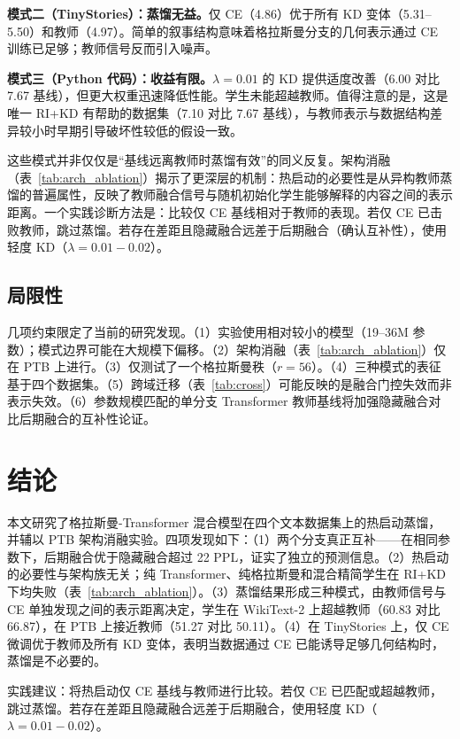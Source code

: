 \documentclass[conference]{IEEEtran}
\begin{document}
\textbf{模式二（TinyStories）：蒸馏无益。}仅 CE（4.86）优于所有 KD 变体（5.31--5.50）和教师（4.97）。简单的叙事结构意味着格拉斯曼分支的几何表示通过 CE 训练已足够；教师信号反而引入噪声。

\textbf{模式三（Python 代码）：收益有限。}$\lambda{=}0.01$ 的 KD 提供适度改善（6.00 对比 7.67 基线），但更大权重迅速降低性能。学生未能超越教师。值得注意的是，这是唯一 RI+KD 有帮助的数据集（7.10 对比 7.67 基线），与教师表示与数据结构差异较小时早期引导破坏性较低的假设一致。

这些模式并非仅仅是“基线远离教师时蒸馏有效”的同义反复。架构消融（表~\ref{tab:arch_ablation}）揭示了更深层的机制：热启动的必要性是从异构教师蒸馏的普遍属性，反映了教师融合信号与随机初始化学生能够解释的内容之间的表示距离。一个实践诊断方法是：比较仅 CE 基线相对于教师的表现。若仅 CE 已击败教师，跳过蒸馏。若存在差距且隐藏融合远差于后期融合（确认互补性），使用轻度 KD（$\lambda{=}0.01{-}0.02$）。

\subsection{局限性}
几项约束限定了当前的研究发现。（1）实验使用相对较小的模型（19--36M 参数）；模式边界可能在大规模下偏移\cite{hu2022lora,dettmers2023qlora,zhang2023adalora}。（2）架构消融（表~\ref{tab:arch_ablation}）仅在 PTB 上进行。（3）仅测试了一个格拉斯曼秩（$r{=}56$）。（4）三种模式的表征基于四个数据集。（5）跨域迁移（表~\ref{tab:cross}）可能反映的是融合门控失效而非表示失效。（6）参数规模匹配的单分支 Transformer 教师基线将加强隐藏融合对比后期融合的互补性论证。

\section{结论}

本文研究了格拉斯曼-Transformer 混合模型在四个文本数据集上的热启动蒸馏，并辅以 PTB 架构消融实验。四项发现如下：（1）两个分支真正互补——在相同参数下，后期融合优于隐藏融合超过 22 PPL，证实了独立的预测信息。（2）热启动的必要性与架构族无关；纯 Transformer、纯格拉斯曼和混合精简学生在 RI+KD 下均失败（表~\ref{tab:arch_ablation}）。（3）蒸馏结果形成三种模式，由教师信号与 CE 单独发现之间的表示距离决定，学生在 WikiText-2 上超越教师（60.83 对比 66.87），在 PTB 上接近教师（51.27 对比 50.11）。（4）在 TinyStories 上，仅 CE 微调优于教师及所有 KD 变体，表明当数据通过 CE 已能诱导足够几何结构时，蒸馏是不必要的。

实践建议：将热启动仅 CE 基线与教师进行比较。若仅 CE 已匹配或超越教师，跳过蒸馏。若存在差距且隐藏融合远差于后期融合，使用轻度 KD（$\lambda{=}0.01{-}0.02$）。
\end{document}
